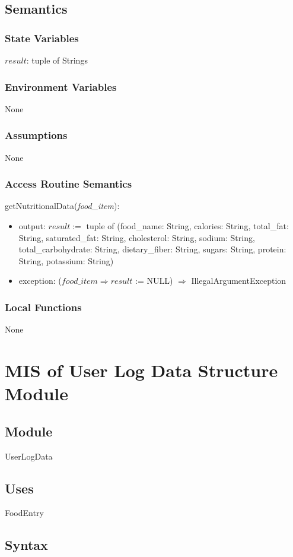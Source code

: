 \documentclass[12pt, titlepage]{article}
\begin{document}
\subsection{Semantics}
\subsubsection{State Variables}
$result$: tuple of Strings
\subsubsection{Environment Variables}
None
\subsubsection{Assumptions}
None
\subsubsection{Access Routine Semantics}
\noindent getNutritionalData(\textit{food\_item}):
\begin{itemize}
	\item output: $result :=$ tuple of (food\_name: String, calories: String, total\_fat: String, saturated\_fat: String, cholesterol: String, sodium: String, total\_carbohydrate: String, dietary\_fiber: String, sugars: String, protein: String, potassium: String)
	\item exception: ($food\_item \Rightarrow result$ := NULL) $\Rightarrow$ \mbox{IllegalArgumentException} 
\end{itemize}
\subsubsection{Local Functions}
None

\newpage

\section{MIS of User Log Data Structure Module} \label{ULD}
\subsection{Module}
UserLogData
\subsection{Uses}
FoodEntry
\subsection{Syntax}
\end{document}
